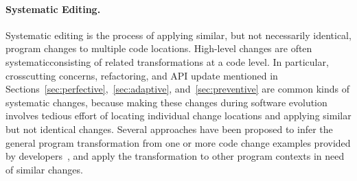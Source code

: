 \paragraph{Systematic Editing.} Systematic editing is the process of applying similar, but not necessarily identical, program changes to multiple code locations. High-level changes are often systematic\textemdash consisting of related transformations at a code level. In particular, crosscutting concerns, refactoring, and API update mentioned in Sections~\ref{sec:perfective},~\ref{sec:adaptive}, and~\ref{sec:preventive} are common kinds of systematic changes, because making these changes during software evolution involves tedious effort of locating individual change locations and applying similar but not identical changes. Several approaches have been proposed to infer the general program transformation from one or more code change examples provided by developers~\cite{MKM2011,Meng12:lase,Rolim:2017}, and apply the transformation to other program contexts in need of similar changes.  


